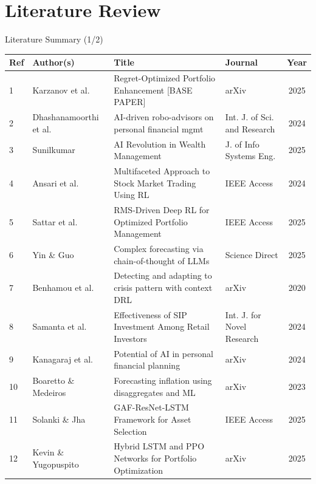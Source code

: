 \documentclass{beamer}
\begin{document}
\section{Literature Review}

\begin{frame}{Literature Summary (1/2)}
    \tiny
    \centering
    \begin{tabular}{p{0.5cm} p{2cm} p{4cm} p{2.5cm} c}
        \toprule
        \textbf{Ref} & \textbf{Author(s)} & \textbf{Title} & \textbf{Journal} & \textbf{Year} \\
        \midrule
        1 & Karzanov et al. & Regret-Optimized Portfolio Enhancement [BASE PAPER] & arXiv & 2025 \\
        2 & Dhashanamoorthi et al. & AI-driven robo-advisors on personal financial mgmt & Int. J. of Sci. and Research & 2024 \\
        3 & Sunilkumar & AI Revolution in Wealth Management & J. of Info Systems Eng. & 2025 \\
        4 & Ansari et al. & Multifaceted Approach to Stock Market Trading Using RL & IEEE Access & 2024 \\
        5 & Sattar et al. & RMS-Driven Deep RL for Optimized Portfolio Management & IEEE Access & 2025 \\
        6 & Yin \& Guo & Complex forecasting via chain-of-thought of LLMs & Science Direct & 2025 \\
        7 & Benhamou et al. & Detecting and adapting to crisis pattern with context DRL & arXiv & 2020 \\
        8 & Samanta et al. & Effectiveness of SIP Investment Among Retail Investors & Int. J. for Novel Research & 2024 \\
        9 & Kanagaraj et al. & Potential of AI in personal financial planning & arXiv & 2024 \\
        10 & Boaretto \& Medeiros & Forecasting inflation using disaggregates and ML & arXiv & 2023 \\
        11 & Solanki \& Jha & GAF-ResNet-LSTM Framework for Asset Selection & IEEE Access & 2025 \\
        12 & Kevin \& Yugopuspito & Hybrid LSTM and PPO Networks for Portfolio Optimization & arXiv & 2025 \\
        \bottomrule
    \end{tabular}
\end{frame}
\end{document}
